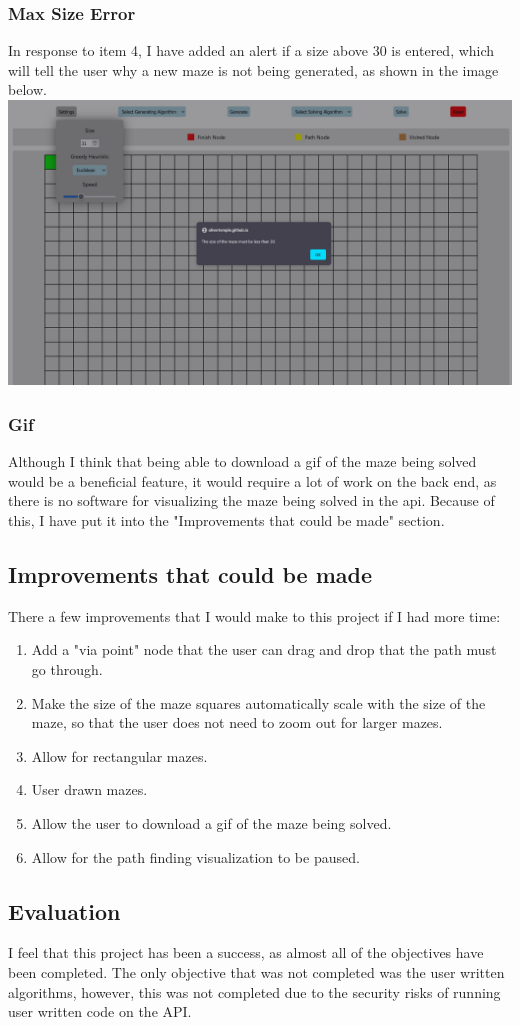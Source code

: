\documentclass[titlepage]{article}
\begin{document}
\subsubsection{Max Size Error}
In response to item 4, I have added an alert if a size above 30 is entered, which will tell the user why a new maze is not being generated, as shown in the image below.
\newline
\includegraphics[width=\linewidth]{assets/feedback/item4.jpg}

\subsubsection{Gif}
Although I think that being able to download a gif of the maze being solved would be a beneficial feature, it would require a lot of work on the back end, as there is no software for visualizing the maze being solved in the api. Because of this, I have put it into the "Improvements that could be made" section.

\subsection{Improvements that could be made}
There a few improvements that I would make to this project if I had more time:
\begin{enumerate}
    \item Add a "via point" node that the user can drag and drop that the path must go through.
    \item Make the size of the maze squares automatically scale with the size of the maze, so that the user does not need to zoom out for larger mazes.
    \item Allow for rectangular mazes.
    \item User drawn mazes.
    \item Allow the user to download a gif of the maze being solved.
    \item Allow for the path finding visualization to be paused.
\end{enumerate}

\subsection{Evaluation}
I feel that this project has been a success, as almost all of the objectives have been completed. The only objective that was not completed was the user written algorithms, however, this was not completed due to the security risks of running user written code on the API.
\end{document}
